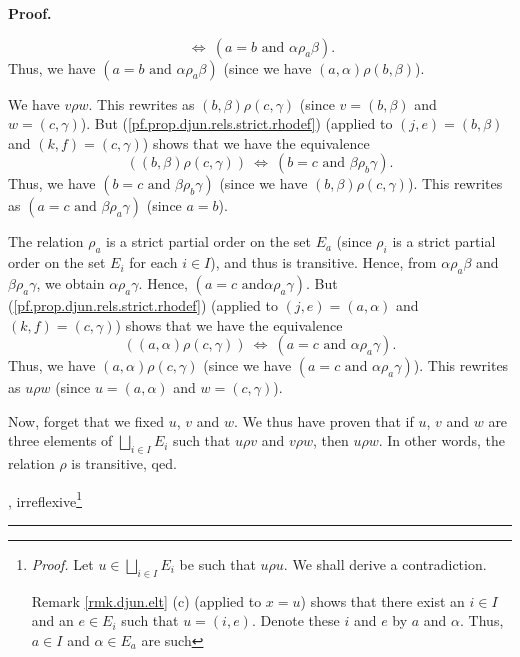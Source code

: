 \documentclass[numbers=enddot,12pt,final,onecolumn,notitlepage,abstracton]{scrartcl}
\theoremstyle{definition}
\newenvironment{proof}[1][Proof]{\noindent\textbf{#1.} }{\ \rule{0.5em}{0.5em}}
\newenvironment{verlong}{}{}
\begin{document}
\begin{verlong}
\begin{footnotesize}
\begin{proof}
{\[\ \Longleftrightarrow\ \left(  a=b\text{ and }\alpha\rho_{a}\beta\right)  .
\]
Thus, we have $\left(  a=b\text{ and }\alpha\rho_{a}\beta\right)  $ (since we
have $\left(  a,\alpha\right)  \rho\left(  b,\beta\right)  $).
\par
We have $v\rho w$. This rewrites as $\left(  b,\beta\right)  \rho\left(
c,\gamma\right)  $ (since $v=\left(  b,\beta\right)  $ and $w=\left(
c,\gamma\right)  $). But (\ref{pf.prop.djun.rels.strict.rhodef}) (applied to
$\left(  j,e\right)  =\left(  b,\beta\right)  $ and $\left(  k,f\right)
=\left(  c,\gamma\right)  $) shows that we have the equivalence%
\[
\left(  \left(  b,\beta\right)  \rho\left(  c,\gamma\right)  \right)
\ \Longleftrightarrow\ \left(  b=c\text{ and }\beta\rho_{b}\gamma\right)  .
\]
Thus, we have $\left(  b=c\text{ and }\beta\rho_{b}\gamma\right)  $ (since we
have $\left(  b,\beta\right)  \rho\left(  c,\gamma\right)  $). This rewrites
as $\left(  a=c\text{ and }\beta\rho_{a}\gamma\right)  $ (since $a=b$).
\par
The relation $\rho_{a}$ is a strict partial order on the set $E_{a}$ (since
$\rho_{i}$ is a strict partial order on the set $E_{i}$ for each $i\in I$),
and thus is transitive. Hence, from $\alpha\rho_{a}\beta$ and $\beta\rho
_{a}\gamma$, we obtain $\alpha\rho_{a}\gamma$. Hence, $\left(  a=c\text{ and
}\alpha\rho_{a}\gamma\right)  $. But (\ref{pf.prop.djun.rels.strict.rhodef})
(applied to $\left(  j,e\right)  =\left(  a,\alpha\right)  $ and $\left(
k,f\right)  =\left(  c,\gamma\right)  $) shows that we have the equivalence%
\[
\left(  \left(  a,\alpha\right)  \rho\left(  c,\gamma\right)  \right)
\ \Longleftrightarrow\ \left(  a=c\text{ and }\alpha\rho_{a}\gamma\right)  .
\]
Thus, we have $\left(  a,\alpha\right)  \rho\left(  c,\gamma\right)  $ (since
we have $\left(  a=c\text{ and }\alpha\rho_{a}\gamma\right)  $). This rewrites
as $u\rho w$ (since $u=\left(  a,\alpha\right)  $ and $w=\left(
c,\gamma\right)  $).
\par
Now, forget that we fixed $u$, $v$ and $w$. We thus have proven that if $u$,
$v$ and $w$ are three elements of $\bigsqcup_{i\in I}E_{i}$ such that $u\rho
v$ and $v\rho w$, then $u\rho w$. In other words, the relation $\rho$ is
transitive, qed.}, irreflexive\footnote{\textit{Proof.} Let $u\in
\bigsqcup_{i\in I}E_{i}$ be such that $u\rho u$. We shall derive a
contradiction.
\par
Remark \ref{rmk.djun.elt} (c) (applied to $x=u$) shows that there exist an
$i\in I$ and an $e\in E_{i}$ such that $u=\left(  i,e\right)  $. Denote these
$i$ and $e$ by $a$ and $\alpha$. Thus, $a\in I$ and $\alpha\in E_{a}$ are such
}
\end{proof}
\end{footnotesize}
\end{verlong}
\end{document}
